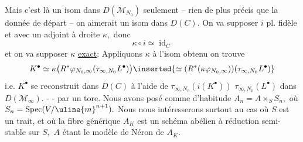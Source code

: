 Mais c'est là un isom dans \(D(\mathcal M_{N_0})\) seulement -- rien de plus précis que la donnée de départ -- on aimerait un isom dans \(D(C).\) On va supposer \(i\) pl. fidèle et avec un adjoint à droite \(\kappa,\) donc
\[
\kappa\circ i\simeq\operatorname{id}_C
\]
et on va supposer \(\kappa\) \uline{exact}: Appliquons \(\kappa\) à l'isom obtenu on trouve
\[
K^\bullet\simeq\kappa\bigl(R^*\varphi_{N_0,\infty}(\tau_{\infty,N_0}L^\bullet)\bigr)
\inserted{\simeq(R^*(\kappa\varphi_{N_0,\infty}))(\tau_{\infty,N_0}L^\bullet)}
\]
i.e. \(K^\bullet\) se reconstruit dans \(D(C)\) à l'aide de \(\tau_{\infty,N_0}(i(K^\bullet))\)  \(\tau_{\infty,N_0}(L^\bullet)\) dans \(D(\mathcal M_\infty).\)
-  -
par un tore. Nous avons posé comme d'habitude \(A_n=A\times_S S_n,\) où \(S_n=\operatorname{Spec}(V/\uline{m}^{n+1}).\) Nous nous intéresserons surtout au cas où \(S\) est un trait, et où la fibre générique \(A_K\) est un schéma abélien à réduction semi-stable sur \(S,\) \(A\) étant le modèle de Néron de \(A_K.\)

